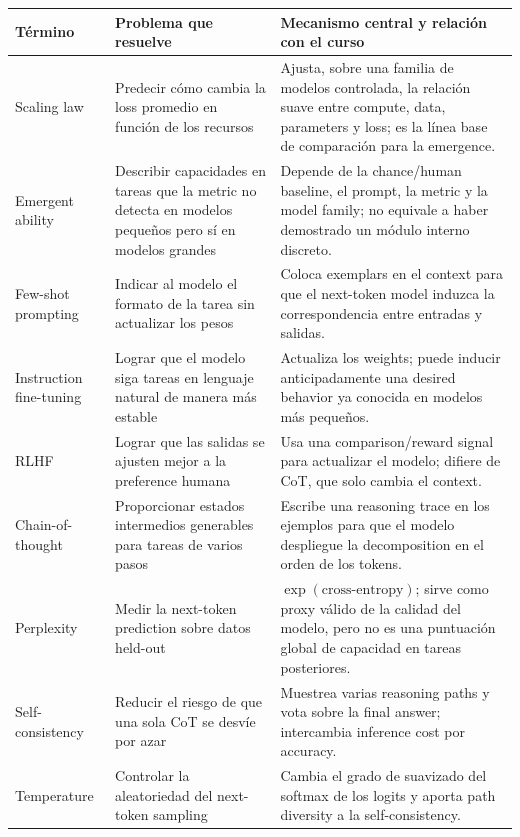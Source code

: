 \begin{longtable}{L{0.19\textwidth}L{0.32\textwidth}L{0.40\textwidth}}
\toprule
\textbf{Término} & \textbf{Problema que resuelve} & \textbf{Mecanismo central y relación con el curso} \\
\midrule
\endhead
Scaling law & Predecir cómo cambia la loss promedio en función de los recursos & Ajusta, sobre una familia de modelos controlada, la relación suave entre compute, data, parameters y loss; es la línea base de comparación para la emergence. \\
Emergent ability & Describir capacidades en tareas que la metric no detecta en modelos pequeños pero sí en modelos grandes & Depende de la chance/human baseline, el prompt, la metric y la model family; no equivale a haber demostrado un módulo interno discreto. \\
Few-shot prompting & Indicar al modelo el formato de la tarea sin actualizar los pesos & Coloca exemplars en el context para que el next-token model induzca la correspondencia entre entradas y salidas. \\
Instruction fine-tuning & Lograr que el modelo siga tareas en lenguaje natural de manera más estable & Actualiza los weights; puede inducir anticipadamente una desired behavior ya conocida en modelos más pequeños. \\
RLHF & Lograr que las salidas se ajusten mejor a la preference humana & Usa una comparison/reward signal para actualizar el modelo; difiere de CoT, que solo cambia el context. \\
Chain-of-thought & Proporcionar estados intermedios generables para tareas de varios pasos & Escribe una reasoning trace en los ejemplos para que el modelo despliegue la decomposition en el orden de los tokens. \\
Perplexity & Medir la next-token prediction sobre datos held-out & $\exp(\text{cross-entropy})$; sirve como proxy válido de la calidad del modelo, pero no es una puntuación global de capacidad en tareas posteriores. \\
Self-consistency & Reducir el riesgo de que una sola CoT se desvíe por azar & Muestrea varias reasoning paths y vota sobre la final answer; intercambia inference cost por accuracy. \\
Temperature & Controlar la aleatoriedad del next-token sampling & Cambia el grado de suavizado del softmax de los logits y aporta path diversity a la self-consistency. \\
\bottomrule
\end{longtable}

